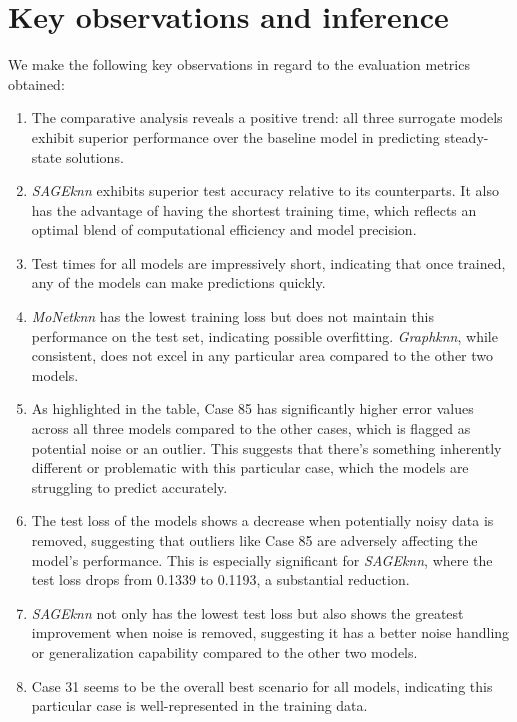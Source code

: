 \section{Key observations and inference}
We make the following key observations in regard to the evaluation metrics obtained: 
\begin{enumerate}
    \item  The comparative analysis reveals a positive trend: all three surrogate models exhibit superior performance over the baseline model in predicting steady-state solutions.
    \item \textit{SAGEknn} exhibits superior test accuracy relative to its counterparts. It also has the advantage of having the shortest training time, which reflects an optimal blend of computational efficiency and model precision.
    \item Test times for all models are impressively short, indicating that once trained, any of the models can make predictions quickly.
    \item \textit{MoNetknn} has the lowest training loss but does not maintain this performance on the test set, indicating possible overfitting. \textit{Graphknn}, while consistent, does not excel in any particular area compared to the other two models. 
    \item As highlighted in the table, Case 85 has significantly higher error values across all three models compared to the other cases, which is flagged as potential noise or an outlier. This suggests that there's something inherently different or problematic with this particular case, which the models are struggling to predict accurately.
    \item The test loss of the models shows a decrease when potentially noisy data is removed, suggesting that outliers like Case 85 are adversely affecting the model's performance. This is especially significant for \textit{SAGEknn}, where the test loss drops from 0.1339 to 0.1193, a substantial reduction.
    \item \textit{SAGEknn} not only has the lowest test loss but also shows the greatest improvement when noise is removed, suggesting it has a better noise handling or generalization capability compared to the other two models. 
    \item Case 31 seems to be the overall best scenario for all models, indicating this particular case is well-represented in the training data.
\end{enumerate}
